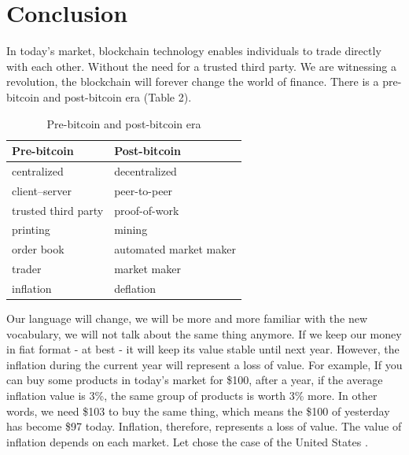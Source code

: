 \documentclass[12pt]{article}
\begin{document}
\section{Conclusion}
In today’s market, blockchain technology enables individuals to trade directly with each other. Without the need for a trusted third party. We are witnessing a revolution, the blockchain will forever change the world of finance. There is a pre-bitcoin and post-bitcoin era (Table 2).
\begin{table}[!h]
  \begin{center}
    \label{tab:t2}
    \begin{tabular}{|l|l|}
      \hline
      \textbf{Pre-bitcoin} &  \textbf{Post-bitcoin}\\
      \hline
      centralized  &  decentralized\\
      \hline
      client–server &  peer-to-peer\\
      \hline
      trusted third party & proof-of-work\\
      \hline
      printing & mining\\
      \hline
      order book & automated market maker\\
      \hline
      trader & market maker\\
      \hline
      inflation & deflation\\
      \hline
    \end{tabular}
    \caption{Pre-bitcoin and post-bitcoin era}
  \end{center}
\end{table}

Our language will change, we will be more and more familiar with the new vocabulary, we will not talk about the same thing anymore. If we keep our money in fiat format - at best - it will keep its value stable until next year. However, the inflation during the current year will represent a loss of value. For example, If you can buy some products in today's market for \$100, after a year, if the average inflation value is 3\%, the same group of products is worth 3\% more. In other words, we need \$103 to buy the same thing, which means the \$100 of yesterday has become \$97 today. Inflation, therefore, represents a loss of value. The value of inflation depends on each market. Let chose the case of the United States \cite{usd2020inflation}.

\clearpage
\end{document}
